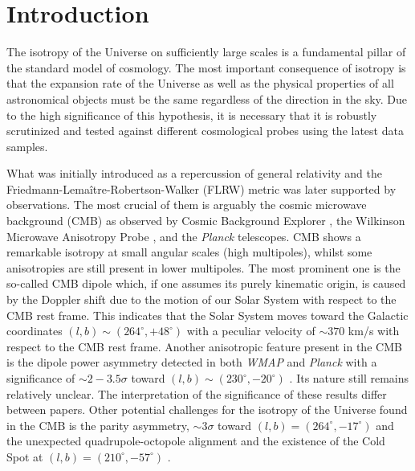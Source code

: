 \documentclass{aa}   %
\begin{document}
\section{Introduction} \label{intro}


The isotropy of the Universe on sufficiently large scales is a fundamental pillar of the standard model of cosmology. The most important consequence of isotropy is that the expansion rate of the Universe as well as the physical properties of all astronomical objects must be the same regardless of the direction in the sky. Due to the high significance of this hypothesis, it is necessary that it is robustly scrutinized and tested against different cosmological probes using the latest data samples. 

What was initially introduced as a repercussion of general relativity and the Friedmann-Lema\^{i}tre-Robertson-Walker (FLRW) metric was later supported by observations. The most crucial of them is arguably the cosmic microwave background (CMB) as observed by Cosmic Background Explorer \citep[\textit{COBE}, ][]{COBE}, the Wilkinson Microwave Anisotropy Probe \citep[\textit{WMAP}, ][]{bennett}, and the \textit{Planck} \citep{planck} telescopes.
CMB shows a remarkable isotropy at small angular scales (high multipoles), whilst some anisotropies are still present in lower multipoles. The most prominent one is the so-called CMB dipole which, if one assumes its purely kinematic origin, is caused by the Doppler shift due to the motion of our Solar System with respect to the CMB rest frame. This indicates that the Solar System moves toward the Galactic coordinates $(l,b)\sim (264^{\circ}, +48^{\circ})$ with a peculiar velocity of $\sim 370$ km/s \citep{kogut,fixsen} with respect to the CMB rest frame. Another anisotropic feature present in the CMB is the dipole power asymmetry detected in both \textit{WMAP} and \textit{Planck} with a significance of $\sim 2-3.5\sigma$ toward $(l,b)\sim (230^{\circ}, -20^{\circ})$ \citep{eriksen,hanson,bennett11,akrami,planck13,planck}. Its nature still remains relatively unclear. The interpretation of the significance of these results differ between papers. Other potential challenges for the isotropy of the Universe found in the CMB is the parity asymmetry, $\sim 3\sigma$ toward $(l,b)=(264^{\circ}, -17^{\circ})$ and the unexpected quadrupole-octopole alignment and the existence of the Cold Spot at $(l,b)=(210^{\circ}, -57^{\circ})$ \citep{tegmark,vielva,kim,aluri,cai14,planck13,planck,schwarz16}.
\end{document}
